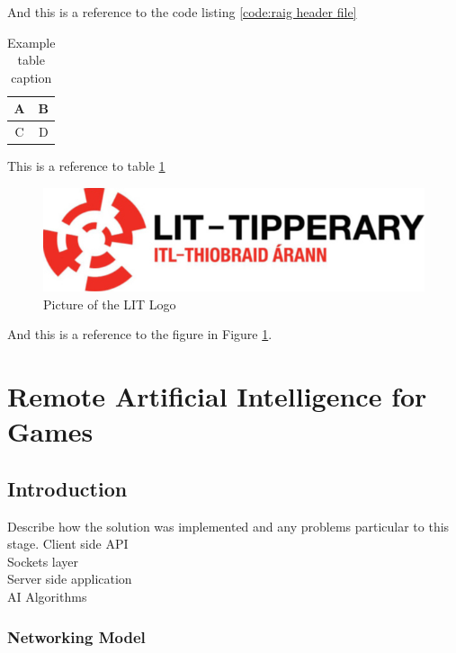 \documentclass[12pt,a4paper,titlepage]{article}
\begin{document}
And this is a reference to the code listing \ref{code:raig header file}


\begin{table}[H] %
\begin{center}

\begin{tabular}{ | c | c |}
\hline
A & B \\ 
\hline
C & D \\
\hline
\end{tabular}
\caption{Example table caption}
\label{table:x Example table}
\end{center}
\end{table}

This is a reference to table \ref{table:x Example table}

\begin{figure}[H]
	\centering
    	\includegraphics[width=\textwidth]{Figures/lit_logo}
	\caption{Picture of the LIT Logo}
	\label{fig:example figure and caption}
\end{figure}

And this is a reference to the figure in Figure \ref{fig:example figure and caption}.

\section{Remote Artificial Intelligence for Games}

\subsection{Introduction}

Describe how the solution was implemented and any problems particular to this stage.
Client side API\\
Sockets layer\\
Server side application\\
AI Algorithms\\

\subsubsection{Networking Model}
\end{document}

